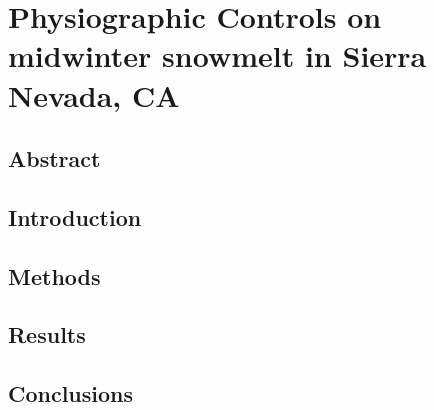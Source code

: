 \hypertarget{ch2}{%
\chapter{Physiographic Controls on midwinter snowmelt in Sierra Nevada, CA}\label{ch2}}


\hypertarget{ch1-abstract}{\section{Abstract}\label{ch1-abstract}}


\hypertarget{ch1-intro}{\section{Introduction}\label{ch1-intro}}

\hypertarget{ch2-methods}{\section{Methods}\label{ch2-methods}}


\hypertarget{ch2-results}{\section{Results}\label{ch2-results}}


\hypertarget{ch2-discussion-3}{\section{Conclusions}\label{ch2-discussion-3}}



